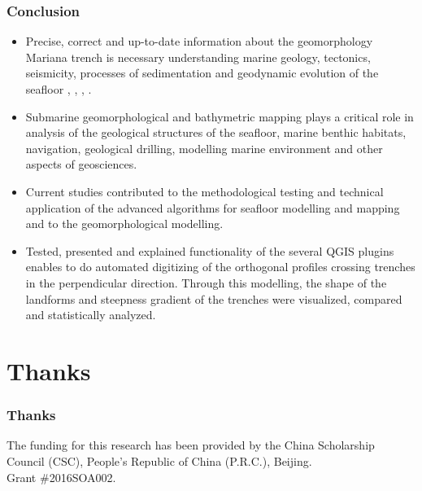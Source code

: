 \documentclass[pdflatex,compress,8pt,
	xcolor={dvipsnames,dvipsnames,svgnames,x11names,table},
	hyperref={colorlinks = true,breaklinks = true, urlcolor = NavyBlue, breaklinks = true}]{beamer}
\begin{document}
\begin{frame}\frametitle{Conclusion}

\begin{itemize}
	\item Precise, correct and up-to-date information about the geomorphology Mariana trench is necessary understanding marine geology, tectonics, seismicity, processes of sedimentation and geodynamic evolution of the seafloor \cite{Lemenkova2006e}, \cite{Lemenkova2006a}, \cite{Lemenkova2006b}, \cite{Lemenkova2006c}.
	\item Submarine geomorphological and bathymetric mapping plays a critical role in analysis of the geological structures of the seafloor, marine benthic habitats, navigation, geological drilling, modelling marine environment and other aspects of geosciences.	
	\item Current studies contributed to the methodological testing and technical application of the advanced algorithms for seafloor modelling and mapping and to the geomorphological modelling. 	
	 \item Tested, presented and explained functionality of the several QGIS plugins enables to do automated digitizing of the orthogonal profiles crossing trenches in the perpendicular direction. Through this modelling, the shape of the landforms and steepness gradient of the trenches were visualized, compared and statistically analyzed. 
\end{itemize}

\end{frame}


\section{Thanks}
\begin{frame}\frametitle{Thanks}
The funding for this research has been provided by the China Scholarship Council (CSC), People’s Republic of China (P.R.C.), Beijing.\\ Grant \#2016SOA002.
\end{frame}
\end{document}
